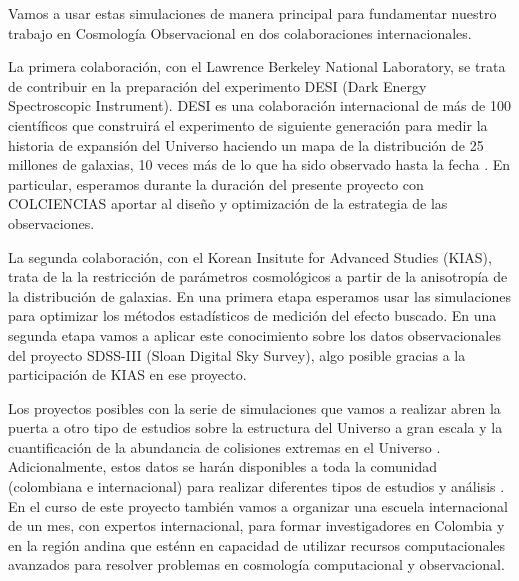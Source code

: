 Vamos a usar estas simulaciones de manera principal para fundamentar
nuestro trabajo en Cosmolog\'ia Observacional en dos colaboraciones
internacionales. 

La primera colaboraci\'on, con el Lawrence Berkeley National Laboratory,
se trata de contribuir en la preparaci\'on del experimento DESI (Dark
Energy Spectroscopic Instrument). 
DESI es una colaboraci\'on internacional de m\'as de 100 cient\'ificos
que construir\'a el experimento de siguiente generaci\'on para medir
la historia de expansi\'on del Universo haciendo un mapa de la
distribuci\'on de 25 millones de galaxias, 10 veces m\'as de lo que ha
sido observado hasta la fecha \cite{DESI}. 
En particular, esperamos durante la duraci\'on del presente proyecto
con COLCIENCIAS aportar al dise\~no y optimizaci\'on de la estrategia
de las observaciones.  

La segunda colaboraci\'on, con el Korean Insitute for Advanced Studies
(KIAS), trata de la la restricci\'on de par\'ametros cosmol\'ogicos a
partir de la anisotrop\'ia de la distribuci\'on de galaxias. 
En una primera etapa esperamos usar las simulaciones para optimizar los
m\'etodos estad\'isticos de medici\'on del efecto buscado. 
En una segunda etapa vamos a aplicar este conocimiento sobre los datos
observacionales del proyecto SDSS-III (Sloan Digital Sky Survey),
algo posible gracias a la participaci\'on de KIAS en ese proyecto.

Los proyectos posibles con la serie de simulaciones que vamos a
realizar abren la puerta a otro tipo de estudios sobre la estructura
del Universo a gran escala \cite{Tweb,Vweb} y la cuantificaci\'on de
la abundancia de colisiones extremas en el Universo
\cite{Bullets2010,Bullets2014}. 
Adicionalmente, estos datos se har\'an disponibles a toda la comunidad
(colombiana e internacional) para realizar diferentes tipos de
estudios y an\'alisis \cite{Multidark}.  
En el curso de este proyecto tambi\'en vamos a organizar una escuela
internacional de un mes, con expertos internacional, para formar
investigadores en Colombia y en la regi\'on andina que est\'enn en capacidad de
utilizar recursos computacionales avanzados para resolver problemas en
cosmolog\'ia computacional y observacional.
